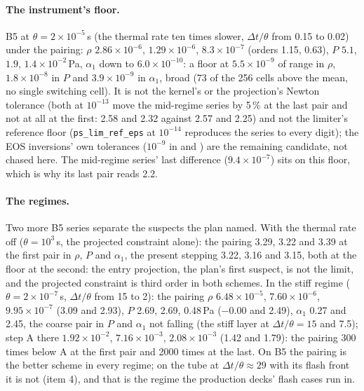\documentclass[11pt,a4paper]{article}
\newcommand{\code}[1]{\texttt{\small #1}}
\newcommand{\Dt}{\Delta t}
\begin{document}
\paragraph{The instrument's floor.}  B5 at $\theta = 2\times10^{-5}$\,s
(the thermal rate ten times slower, $\Dt/\theta$ from 0.15 to 0.02)
under the pairing: $\rho$ $2.86\times10^{-6}$, $1.29\times10^{-6}$,
$8.3\times10^{-7}$ (orders 1.15, 0.63), $P$ $5.1$, $1.9$,
$1.4\times10^{-2}$\,Pa, $\alpha_1$ down to $6.0\times10^{-10}$: a floor
at $5.5\times10^{-9}$ of range in $\rho$, $1.8\times10^{-8}$ in $P$ and
$3.9\times10^{-9}$ in $\alpha_1$, broad (73 of the 256 cells above the
mean, no single switching cell).  It is not the kernel's or the
projection's Newton tolerance (both at $10^{-13}$ move the mid-regime
series by 5\,\% at the last pair and not at all at the first: 2.58 and
2.32 against 2.57 and 2.25) and not the limiter's reference floor
(\code{ps\_lim\_ref\_eps} at $10^{-14}$ reproduces the series to every
digit); the EOS inversions' own tolerances ($10^{-9}$ in
 and ) are the
remaining candidate, not chased here.  The mid-regime series' last
difference ($9.4\times10^{-7}$) sits on this floor, which is why its
last pair reads 2.2.

\paragraph{The regimes.}  Two more B5 series separate the suspects the
plan named.  With the thermal rate off ($\theta = 10^{3}$\,s, the
projected constraint alone): the pairing 3.29, 3.22 and 3.39 at the
first pair in $\rho$, $P$ and $\alpha_1$, the present stepping 3.22,
3.16 and 3.15, both at the floor at the second: the entry projection,
the plan's first suspect, is not the limit, and the projected
constraint is third order in both schemes.  In the stiff regime
($\theta = 2\times10^{-7}$\,s, $\Dt/\theta$ from 15 to 2): the pairing
$\rho$ $6.48\times10^{-5}$, $7.60\times10^{-6}$, $9.95\times10^{-7}$
(3.09 and 2.93), $P$ 2.69, 2.69, 0.48\,Pa ($-0.00$ and 2.49), $\alpha_1$
0.27 and 2.45, the coarse pair in $P$ and $\alpha_1$ not falling (the
stiff layer at $\Dt/\theta = 15$ and 7.5); step A there
$1.92\times10^{-2}$, $7.16\times10^{-3}$, $2.08\times10^{-3}$ (1.42
and 1.79): the pairing 300 times below A at the first pair and 2000
times at the last.  On B5 the pairing is the better scheme in every
regime; on the tube at $\Dt/\theta \approx 29$ with its flash front it
is not (item 4), and that is the regime the production decks' flash
cases run in.
\end{document}
